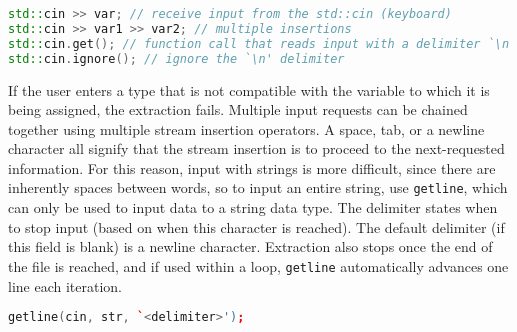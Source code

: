 \documentclass[10pt]{article}
\begin{document}
\begin{lstlisting}[language=C++]
std::cin >> var; // receive input from the std::cin (keyboard)
std::cin >> var1 >> var2; // multiple insertions
std::cin.get(); // function call that reads input with a delimiter `\n'
std::cin.ignore(); // ignore the `\n' delimiter 
\end{lstlisting}

If the user enters a type that is not compatible with the variable to which it is being assigned, the extraction fails. Multiple input requests can be chained together using multiple stream insertion operators. A space, tab, or a newline character all signify that the stream insertion is to proceed to the next-requested information. For this reason, input with strings is more difficult, since there are inherently spaces between words, so to input an entire string, use \texttt{getline}, which can only be used to input data to a string data type. The delimiter states when to stop input (based on when this character is reached). The default delimiter (if this field is blank) is a newline character. Extraction also stops once the end of the file is reached, and if used within a loop, \texttt{getline} automatically advances one line each iteration.

\begin{lstlisting}[language=C++]
getline(cin, str, `<delimiter>');
\end{lstlisting}
\end{document}
